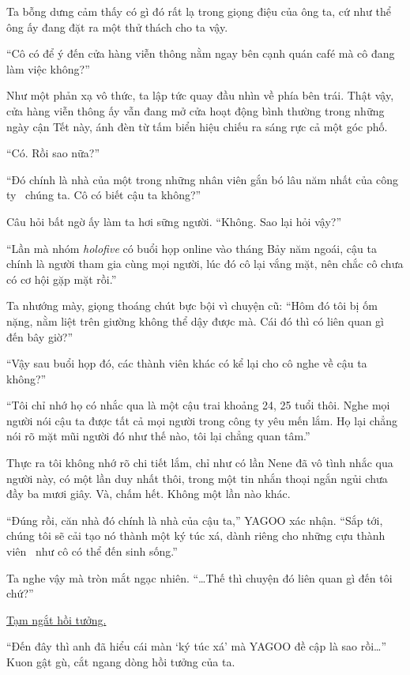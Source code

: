 \documentclass[../main.tex]{subfiles}
\begin{document}
Ta bỗng dưng cảm thấy có gì đó rất lạ trong giọng điệu của ông ta, cứ như thể ông ấy đang đặt ra một thử thách cho ta vậy.

``Cô có để ý đến cửa hàng viễn thông nằm ngay bên cạnh quán café mà cô đang làm việc không?''

Như một phản xạ vô thức, ta lập tức quay đầu nhìn về phía bên trái. Thật vậy, cửa hàng viễn thông ấy vẫn đang mở cửa hoạt động bình thường trong những ngày cận Tết này, ánh đèn từ tấm biển hiệu chiếu ra sáng rực cả một góc phố.

``Có. Rồi sao nữa?''

``Đó chính là nhà của một trong những nhân viên gắn bó lâu năm nhất của công ty \hll\ chúng ta. Cô có biết cậu ta không?''

Câu hỏi bất ngờ ấy làm ta hơi sững người. ``Không. Sao lại hỏi vậy?''

``Lần mà nhóm \textit{holofive} có buổi họp online vào tháng Bảy năm ngoái, cậu ta chính là người tham gia cùng mọi người, lúc đó cô lại vắng mặt, nên chắc cô chưa có cơ hội gặp mặt rồi.''

Ta nhướng mày, giọng thoáng chút bực bội vì chuyện cũ: ``Hôm đó tôi bị ốm nặng, nằm liệt trên giường không thể dậy được mà. Cái đó thì có liên quan gì đến bây giờ?''

``Vậy sau buổi họp đó, các thành viên khác có kể lại cho cô nghe về cậu ta không?''

``Tôi chỉ nhớ họ có nhắc qua là một cậu trai khoảng 24, 25 tuổi thôi. Nghe mọi người nói cậu ta được tất cả mọi người trong công ty yêu mến lắm. Họ lại chẳng nói rõ mặt mũi người đó như thế nào, tôi lại chẳng quan tâm.''

Thực ra tôi không nhớ rõ chi tiết lắm, chỉ như có lần Nene đã vô tình nhắc qua người này, có một lần duy nhất thôi, trong một tin nhắn thoại ngắn ngủi chưa đầy ba mươi giây. Và, chấm hết. Không một lần nào khác.

``Đúng rồi, căn nhà đó chính là nhà của cậu ta,'' YAGOO xác nhận. ``Sắp tới, chúng tôi sẽ cải tạo nó thành một ký túc xá, dành riêng cho những cựu thành viên \hll\ như cô có thể đến sinh sống.''

Ta nghe vậy mà tròn mắt ngạc nhiên. ``\dots Thế thì chuyện đó liên quan gì đến tôi chứ?''

\begin{center}
  \uline{Tạm ngắt hồi tưởng.}
\end{center}

``Đến đây thì anh đã hiểu cái màn `ký túc xá' mà YAGOO đề cập là sao rồi\dots'' Kuon gật gù, cắt ngang dòng hồi tưởng của ta.
\end{document}
